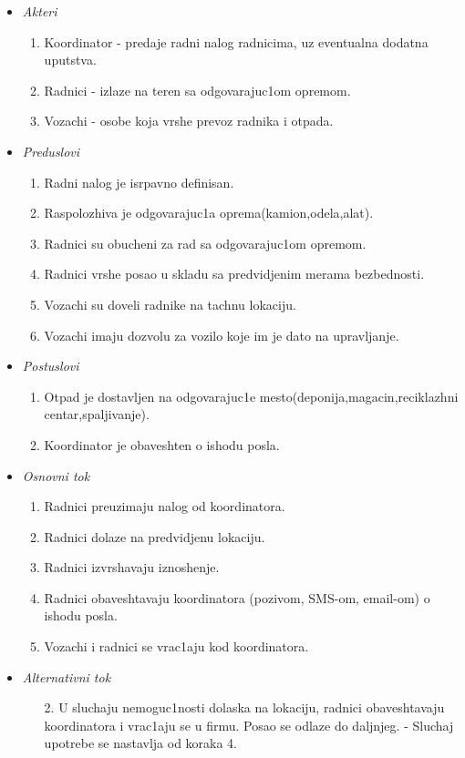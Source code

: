 \documentclass[10 pt]{article}
\begin{document}
	\begin{itemize}
		\label{OsnovniSlucaj}
		\item\textit{Akteri}
			\begin{enumerate}
				\item Koordinator - predaje radni nalog radnicima, uz eventualna dodatna uputstva.
				\item Radnici - izlaze na teren sa odgovarajuc1om opremom.
				\item Vozachi - osobe koja vrshe prevoz radnika i otpada.
			\end{enumerate}		
			
		\item\textit{Preduslovi}
			\begin{enumerate}
				\item Radni nalog je isrpavno definisan.
				\item Raspolozhiva je odgovarajuc1a oprema(kamion,odela,alat).
				\item Radnici su obucheni za rad sa odgovarajuc1om opremom.
				\item Radnici vrshe posao u skladu sa predvidjenim merama bezbednosti.
				\item Vozachi su doveli radnike na tachnu lokaciju.
				\item Vozachi imaju dozvolu za vozilo koje im je dato na upravljanje.
			\end{enumerate}
		
		\item\textit{Postuslovi}
			\begin{enumerate}
				\item Otpad je dostavljen na odgovarajuc1e mesto(deponija,magacin,reciklazhni centar,spaljivanje).
				\item Koordinator je obaveshten o ishodu posla.
			\end{enumerate}
		
		\item\textit{Osnovni tok}
			\begin{enumerate}
				\item Radnici preuzimaju nalog od koordinatora.
				\item Radnici dolaze na predvidjenu lokaciju.
				\item Radnici izvrshavaju iznoshenje.
				\item Radnici obaveshtavaju koordinatora (pozivom, SMS-om, email-om) o ishodu posla.
				\item Vozachi i radnici se vrac1aju kod koordinatora.
			\end{enumerate}
		
		\item\textit{Alternativni tok}
			\begin{enumerate}
				\item [2.] U sluchaju nemoguc1nosti dolaska na lokaciju, radnici obaveshtavaju koordinatora i vrac1aju se u firmu. Posao se odlaze do daljnjeg. - Sluchaj upotrebe se nastavlja od koraka 4. 
			\end{enumerate}
			
	\end{itemize}		
	
\end{document}
